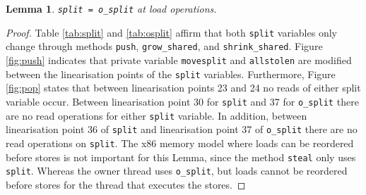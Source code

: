 \documentclass{sig-alternate-br}
\newtheorem{lemma}{Lemma}
\begin{document}
\begin{lemma}
	\texttt{split = o\_split} at load operations.
	\label{lem:split}
\end{lemma}
\begin{proof}
	Table \ref{tab:split} and \ref{tab:osplit} affirm that both \texttt{split} variables only change through methods \texttt{push}, \texttt{grow\_shared}, and \texttt{shrink\_shared}.
	Figure \ref{fig:push} indicates that private variable \texttt{movesplit} and \texttt{allstolen} are modified between the linearisation points of the \texttt{split} variables.
	Furthermore, Figure \ref{fig:pop} states that between linearisation points 23 and 24 no reads of either split variable occur.
	Between linearisation point 30 for \texttt{split} and 37 for \texttt{o\_split} there are no read operations for either \texttt{split} variable.
	In addition, between linearisation point 36 of \texttt{split} and linearisation point 37 of \texttt{o\_split} there are no read operations on \texttt{split}.	
	The x86 memory model where loads can be reordered before stores is not important for this Lemma, since the method \texttt{steal} only uses \texttt{split}.
	Whereas the owner thread uses \texttt{o\_split}, but loads cannot be reordered before stores for the thread that executes the stores.		
\end{proof}
\end{document}
